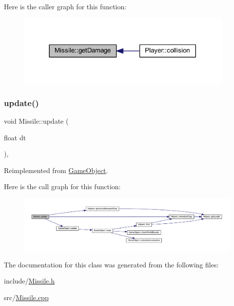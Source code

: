 Here is the caller graph for this function\+:
\nopagebreak
\begin{figure}[H]
\begin{center}
\leavevmode
\includegraphics[width=305pt]{class_missile_ae07a94126a1475af4349006dc825dae9_icgraph}
\end{center}
\end{figure}
\mbox{\label{class_missile_a5750280ac2f18df9cf3f5f87341be655}} 
\subsubsection{\texorpdfstring{update()}{update()}}
{\footnotesize\ttfamily void Missile\+::update (\begin{DoxyParamCaption}\item[{float}]{dt }\end{DoxyParamCaption})\hspace{0.3cm}{\ttfamily [override]}, {\ttfamily [virtual]}}



Reimplemented from \hyperlink{class_game_object_a2fece397b6343682d639f8943f124d0e}{Game\+Object}.

Here is the call graph for this function\+:
\nopagebreak
\begin{figure}[H]
\begin{center}
\leavevmode
\includegraphics[width=350pt]{class_missile_a5750280ac2f18df9cf3f5f87341be655_cgraph}
\end{center}
\end{figure}


The documentation for this class was generated from the following files\+:\begin{DoxyCompactItemize}
\item 
include/\hyperlink{_missile_8h}{Missile.\+h}\item 
src/\hyperlink{_missile_8cpp}{Missile.\+cpp}\end{DoxyCompactItemize}
